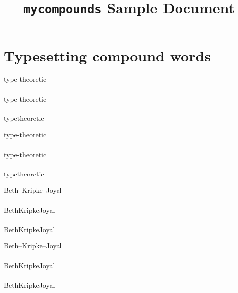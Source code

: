 \documentclass{article}
\begin{document}
\title{\texttt{mycompounds} Sample Document}
\author{}
\date{}

\maketitle

\begin{verbatim*}
\usepackage[hyperref]{mycompounds}
\usepackage{hyperref}
\end{verbatim*}

\section{Typesetting compound words}

\begin{verbatim*}
\begin{minipage}{0pt}
type-theoretic\\\\
type\hyp{}theoretic\\\\
type\nbhyp{}theoretic\\
\end{minipage}
\end{verbatim*}
%
\begin{minipage}{0pt}
  type-theoretic\\\\
  type\hyp{}theoretic\\\\
  type\nbhyp{}theoretic\\
\end{minipage}

\begin{verbatim*}
\begin{minipage}{0pt}
Beth--Kripke--Joyal\\\\
Beth\ndash{}Kripke\ndash{}Joyal\\\\
Beth\nbndash{}Kripke\nbndash{}Joyal\\
\end{minipage}
\end{verbatim*}
%
\begin{minipage}{0pt}
  Beth--Kripke--Joyal\\\\
  Beth\ndash{}Kripke\ndash{}Joyal\\\\
  Beth\nbndash{}Kripke\nbndash{}Joyal\\
\end{minipage}
\end{document}
